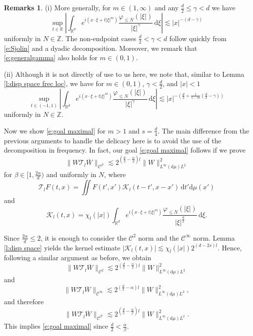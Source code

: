\documentclass[a4paper]{amsart}
\numberwithin{equation}{section}%
\theoremstyle{plain}%
\theoremstyle{definition}
\newtheorem*{remarks}{Remarks}
\theoremstyle{remark}%
\def\d{\mathrm{d}}
\def\C{\mathcal{C}}
\def\C{\mathcal{C}}
\begin{document}
\begin{remarks}
(i) More generally, for $m\in(1,\infty)$ and any $\frac d2\leq\gamma<d$ we have
\begin{equation} \label{e:generalgamma}
\sup_{t\in\mathbb R}\left|\int_{\mathbb R^d} e^{i(x\cdot \xi+t|\xi|^m)}\frac{\varphi_{\leq N}(|\xi|)}{|\xi|^\gamma}\,\d\xi\right|
\lesssim
|x|^{-(d-\gamma)}
\end{equation}
uniformly in $N\in\mathbb Z$. The non-endpoint cases $\frac d2 < \gamma<d$ follow quickly from \eqref{e:Sjolin} and a dyadic decomposition. Moreover, we remark that \eqref{e:generalgamma} also holds for $m\in (0,1)$. 

(ii) Although it is not directly of use to us here, we note that, similar to Lemma \ref{l:disp space frec loc}, we have for $m\in(0,1)$, $\gamma<\frac d2$, and $|x|<1$
\[
\sup_{t\in(-1,1)}
\left|
\int_{\mathbb R^d} e^{i(x\cdot\xi+t|\xi|^m)}\frac{\varphi_{\leq N} (|\xi|)}{|\xi|^{\gamma}}\,\d\xi
\right|
\lesssim
|x|^{-(\frac d2+\frac{1}{1-m}(\frac d2-\gamma))}
\]
uniformly in $N\in \mathbb Z$.
\end{remarks}

Now we show \eqref{e:goal maximal} for $m>1$ and $s=\frac d4$. The main difference from the previous arguments to handle the delicacy here is to avoid the use of the decomposition in frequency. In fact, our goal \eqref{e:goal maximal} follows if we prove
\[
\|W\mathcal T_l\overline{W}\|_{\C^{\beta'}}
\lesssim
2^{(\frac{d}{2}-\frac\alpha\beta)l}\|W\|_{L^\infty(\d\mu)L^2}^2
\]
for $\beta\in[1,\frac{2\alpha}{d})$ and uniformly in $N$, where
\[
\mathcal T_lF(t,x)
=
\iint F(t',x')\mathcal K_l(t-t',x-x')\, \d t'\d \mu(x')
\]
and
\[
\mathcal K_l(t,x)
=
\chi_l(|x|)
\int_{\mathbb R^d}e^{i(x\cdot\xi+t|\xi|^m)}\frac{\varphi_{\leq N}(|\xi|)}{|\xi|^{\frac{d}{2}}}\,\d\xi.
\]

Since $\frac{2\alpha}{d}\leq2$, it is enough to consider the $\C^2$ norm and the $\C^\infty$ norm. Lemma \ref{l:disp space} yields the kernel estimate $|\mathcal K_l(t,x)|\lesssim \chi_l(|x|)2^{(d-2s)l}$. Hence, following a similar argument as before, we obtain
\[
\|W\mathcal T_l\overline{W}\|_{\C^2}
\lesssim
2^{(\frac{d}{2}-\frac \alpha2)l}\|W\|_{L^\infty(\d\mu)L^2}^2
\] 
and
\[
\|W\mathcal T_l\overline{W}\|_{\C^\infty}
\lesssim
2^{(\frac{d}{2}-\alpha)l}\|W\|_{L^\infty(\d\mu)L^2}^2,
\] 
and therefore
\[
\|W\mathcal T_l\overline{W}\|_{\C^{\beta'}}
\lesssim
2^{(\frac{d}{2}-\frac \alpha \beta)l}\|W\|_{L^\infty(\d\mu)L^2}^2.
\]
This implies \eqref{e:goal maximal} since $\frac d2<\frac\alpha\beta$.
\end{document}
